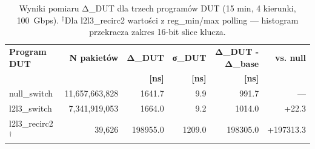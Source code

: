 \begin{table}[t]
\centering
\caption{Wyniki pomiaru Δ_DUT dla trzech programów DUT (15 min, 4 kierunki, 100~Gbps). $^\dagger$Dla l2l3\_recirc2 wartości z reg\_min/max polling — histogram przekracza zakres 16-bit slice klucza.}
\label{tab:dut_comparison}
\begin{tabular}{l r r r r r}
\toprule
\textbf{Program DUT} & \textbf{N pakietów} & \textbf{Δ\_DUT} & \textbf{σ\_DUT} & \textbf{Δ\_DUT - Δ\_base} & \textbf{vs. null} \\
& & \textbf{[ns]} & \textbf{[ns]} & \textbf{[ns]} & \\
\midrule
null\_switch & 11,657,663,828 & 1641.7 & 9.9 & 991.7 & — \\
l2l3\_switch & 7,341,919,053 & 1664.0 & 9.2 & 1014.0 & +22.3 \\
l2l3\_recirc2$^\dagger$ & 39,626 & 198955.0 & 1209.0 & 198305.0 & +197313.3 \\
\bottomrule
\end{tabular}
\end{table}
